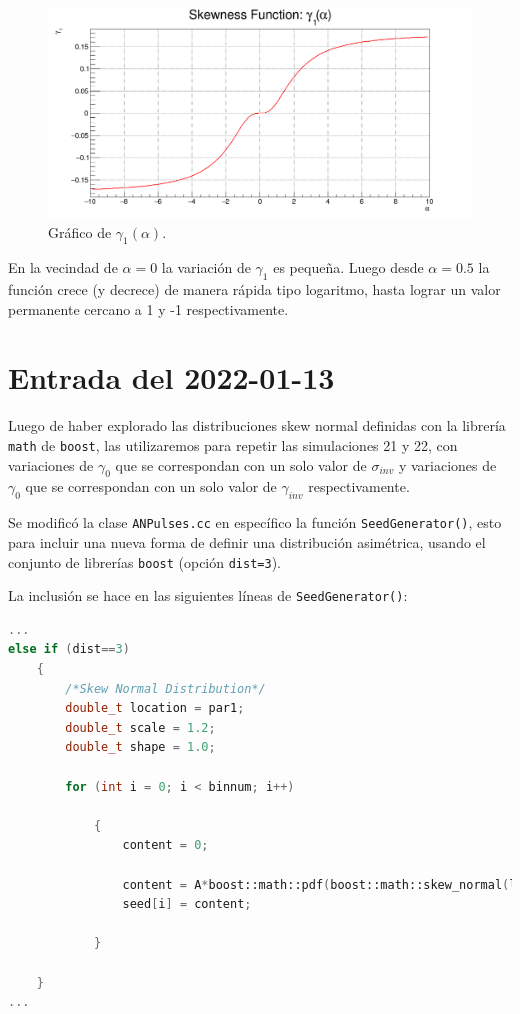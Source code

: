 \documentclass[11pt,letterpaper]{article}
\begin{document}
 \begin{figure}[H]
    \includegraphics[width=1.\textwidth]{img/skewness_function.png}
    \centering
     \cprotect\caption{Gráfico de $\gamma_{1}(\alpha)$.} 
\label{skewness_function}
\end{figure}

En la vecindad de $\alpha=0$ la variación de $\gamma_1$ es pequeña. Luego desde $\alpha=0.5$ la función crece (y decrece) de manera rápida tipo logaritmo, hasta lograr un valor permanente cercano a 1 y -1 respectivamente.

\section{Entrada del 2022-01-13}

Luego de haber explorado las distribuciones skew normal definidas con la librería \verb|math| de \verb|boost|, las utilizaremos para repetir las simulaciones 21 y 22, con variaciones de $\gamma_{0}$ que se correspondan con un solo valor de $\sigma_{inv}$ y variaciones de $\gamma_{0}$ que se correspondan con un solo valor de $\gamma_{inv}$ respectivamente.

Se modificó la clase \verb|ANPulses.cc| en específico la función \verb|SeedGenerator()|, esto para incluir una nueva forma de definir una distribución asimétrica, usando el conjunto de librerías \verb|boost| (opción \verb|dist=3|). 

La inclusión se hace en las siguientes líneas de \verb|SeedGenerator()|:

\begin{lstlisting}[language=c++]
...
else if (dist==3)
	{
		/*Skew Normal Distribution*/
		double_t location = par1;
		double_t scale = 1.2;
		double_t shape = 1.0;

		for (int i = 0; i < binnum; i++)
		
			{
				content = 0;
		
				content = A*boost::math::pdf(boost::math::skew_normal(location, scale, SIG_L),bins[i]); //1.5
				seed[i] = content;
						
			}
		
	}
...
\end{lstlisting}
\end{document}
